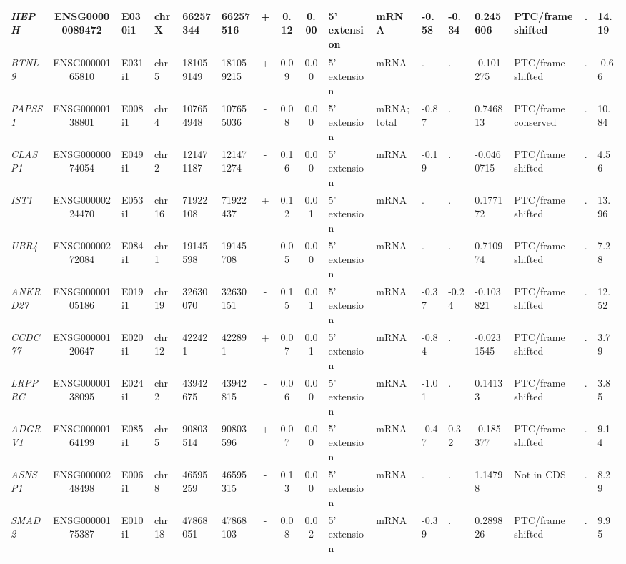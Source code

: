 \begin{landscape}
\begin{table}
{\begin{tabular}{|l|c|l|l|l|l|c|c|c|l|l|l|l|l|l|l|l|}
		\textit{HEPH} & ENSG00000089472 & E030i1 & chrX  & 66257344 & 66257516 & +     & 0.12  & 0.00  & 5' extension & mRNA  & -0.58 & -0.34 & 0.245606 & PTC/frame shifted & . &  14.19 \\ \hline
		\textit{BTNL9} & ENSG00000165810 & E031i1 & chr5  & 181059149 & 181059215 & +     & 0.09  & 0.00  & 5' extension & mRNA  & . & . & -0.101275 & PTC/frame shifted & . &  -0.66 \\ \hline
		\textit{PAPSS1} & ENSG00000138801 & E008i1 & chr4  & 107654948 & 107655036 & -     & 0.08  & 0.00  & 5' extension & mRNA;total & -0.87 & . & 0.746813 & PTC/frame conserved & . &  10.84 \\ \hline
		\textit{CLASP1} & ENSG00000074054 & E049i1 & chr2  & 121471187 & 121471274 & -     & 0.16  & 0.00  & 5' extension & mRNA  & -0.19 & . & -0.0460715 & PTC/frame shifted & . &  4.56 \\ \hline
		\textit{IST1} & ENSG00000224470 & E053i1 & chr16 & 71922108 & 71922437 & +     & 0.12  & 0.01  & 5' extension & mRNA  & . & . & 0.177172 & PTC/frame shifted & . &  13.96 \\ \hline
		\textit{UBR4} & ENSG00000272084& E084i1 & chr1  & 19145598 & 19145708 & -     & 0.05  & 0.00  & 5' extension & mRNA  & . & . & 0.710974 & PTC/frame shifted & . &  7.28 \\ \hline
		\textit{ANKRD27} & ENSG00000105186 & E019i1 & chr19 & 32630070 & 32630151 & -     & 0.15  & 0.01  & 5' extension & mRNA  & -0.37 & -0.24 & -0.103821 & PTC/frame shifted & . &  12.52 \\ \hline
		\textit{CCDC77} & ENSG00000120647 & E020i1 & chr12 & 422421 & 422891 & +     & 0.07  & 0.01  & 5' extension & mRNA  & -0.84 & . & -0.0231545 & PTC/frame shifted & . &  3.79 \\ \hline
		\textit{LRPPRC} & ENSG00000138095 & E024i1 & chr2  & 43942675 & 43942815 & -     & 0.06  & 0.00  & 5' extension & mRNA  & -1.01 & . & 0.14133 & PTC/frame shifted & . &  3.85 \\ \hline
		\textit{ADGRV1} & ENSG00000164199 & E085i1 & chr5  & 90803514 & 90803596 & +     & 0.07  & 0.00  & 5' extension & mRNA  & -0.47 & 0.32  & -0.185377 & PTC/frame shifted & . &  9.14 \\ \hline
		\textit{ASNSP1} & ENSG00000248498 & E006i1 & chr8  & 46595259 & 46595315 & -     & 0.13  & 0.00  & 5' extension & mRNA  & . & . & 1.14798 & Not in CDS     & . &  8.29 \\ \hline
		\textit{SMAD2} & ENSG00000175387 & E010i1 & chr18 & 47868051 & 47868103 & -     & 0.08  & 0.02  & 5' extension & mRNA  & -0.39 & . & 0.289826 & PTC/frame shifted & . &  9.95 \\ \hline

\end{tabular}}
\end{table}
\end{landscape}
